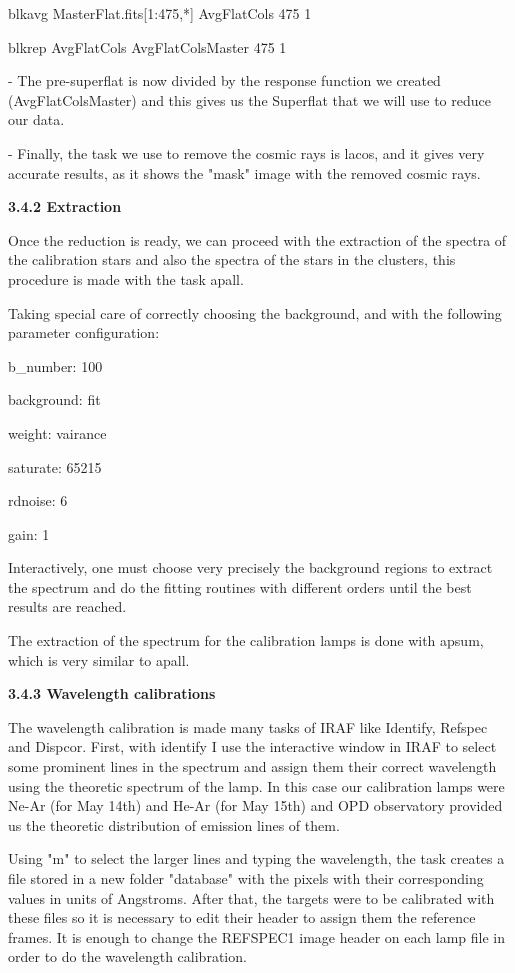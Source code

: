 \documentclass[english]{article}
\begin{document}
blkavg MasterFlat.fits[1:475,*] AvgFlatCols 475 1

blkrep AvgFlatCols AvgFlatColsMaster 475 1

- The pre-superflat is now divided by the response function we created (AvgFlatColsMaster) and this gives us the Superflat that we will use to reduce our data.

- Finally, the task we use to remove the cosmic rays is lacos, and it gives very accurate results, as it shows the "mask" image with the removed cosmic rays.

\textbf{{\large 3.4.2 Extraction}}

Once the reduction is ready, we can proceed with the extraction of the spectra of the calibration stars and also the spectra of the stars in the clusters, this procedure is made with the task apall.

Taking special care of correctly choosing the background, and with the following parameter configuration:

b\_number: 100

background: fit

weight: vairance

saturate: 65215

rdnoise: 6

gain: 1

Interactively, one must choose very precisely the background regions to extract the spectrum and do the fitting routines with different orders until the best results are reached.

The extraction of the spectrum for the calibration lamps is done with apsum, which is very similar to apall.

\textbf{{\large 3.4.3 Wavelength calibrations}}

The wavelength calibration is made many tasks of IRAF like Identify, Refspec and Dispcor. First, with identify I use the interactive window in IRAF to select some prominent lines in the spectrum and assign them their correct wavelength using the theoretic spectrum of the lamp. In this case our calibration lamps were Ne-Ar (for May 14th) and He-Ar (for May 15th)  and OPD observatory provided us the theoretic distribution of emission lines of them.

Using "m" to select the larger lines and typing the wavelength, the task creates a file stored in a new folder "database" with the pixels with their corresponding values in units of Angstroms. After that, the targets were to be calibrated with these files so it is necessary to edit their header to assign them the reference frames. It is enough to change the REFSPEC1 image header on each lamp file in order to do the wavelength calibration. 
\end{document}
